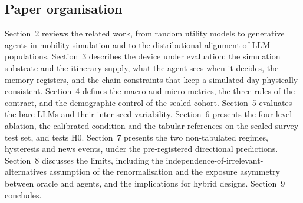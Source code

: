 \subsection{Paper organisation}

Section~2 reviews the related work, from random utility models to generative agents in mobility simulation and to the distributional alignment of LLM populations. Section~3 describes the device under evaluation: the simulation substrate and the itinerary supply, what the agent sees when it decides, the memory registers, and the chain constraints that keep a simulated day physically consistent. Section~4 defines the macro and micro metrics, the three rules of the contract, and the demographic control of the sealed cohort. Section~5 evaluates the bare LLMs and their inter-seed variability. Section~6 presents the four-level ablation, the calibrated condition and the tabular references on the sealed survey test set, and tests H0. Section~7 presents the two non-tabulated regimes, hysteresis and news events, under the pre-registered directional predictions. Section~8 discusses the limits, including the independence-of-irrelevant-alternatives assumption of the renormalisation and the exposure asymmetry between oracle and agents, and the implications for hybrid designs. Section~9 concludes.
